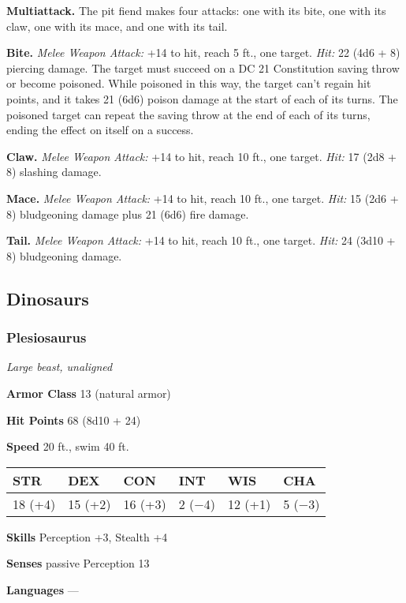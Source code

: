\documentclass[
]{article}
\begin{document}
\textbf{Multiattack.} The pit fiend makes four attacks: one with its
bite, one with its claw, one with its mace, and one with its tail.

\textbf{Bite.} \emph{Melee Weapon Attack:} +14 to hit, reach 5 ft., one
target. \emph{Hit:} 22 (4d6 + 8) piercing damage. The target must
succeed on a DC 21 Constitution saving throw or become poisoned. While
poisoned in this way, the target can't regain hit points, and it takes
21 (6d6) poison damage at the start of each of its turns. The poisoned
target can repeat the saving throw at the end of each of its turns,
ending the effect on itself on a success.

\textbf{Claw.} \emph{Melee Weapon Attack:} +14 to hit, reach 10 ft., one
target. \emph{Hit:} 17 (2d8 + 8) slashing damage.

\textbf{Mace.} \emph{Melee Weapon Attack:} +14 to hit, reach 10 ft., one
target. \emph{Hit:} 15 (2d6 + 8) bludgeoning damage plus 21 (6d6) fire
damage.

\textbf{Tail.} \emph{Melee Weapon Attack:} +14 to hit, reach 10 ft., one
target. \emph{Hit:} 24 (3d10 + 8) bludgeoning damage.

\hypertarget{dinosaurs}{%
\subsection{Dinosaurs}\label{dinosaurs}}

\hypertarget{plesiosaurus}{%
\subsubsection{Plesiosaurus}\label{plesiosaurus}}

\emph{Large beast, unaligned}

\textbf{Armor Class} 13 (natural armor)

\textbf{Hit Points} 68 (8d10 + 24)

\textbf{Speed} 20 ft., swim 40 ft.

\begin{longtable}[]{@{}llllll@{}}
\toprule
STR & DEX & CON & INT & WIS & CHA\tabularnewline
\midrule
\endhead
18 (+4) & 15 (+2) & 16 (+3) & 2 (−4) & 12 (+1) & 5 (−3)\tabularnewline
\bottomrule
\end{longtable}

\textbf{Skills} Perception +3, Stealth +4

\textbf{Senses} passive Perception 13

\textbf{Languages} ---
\end{document}

